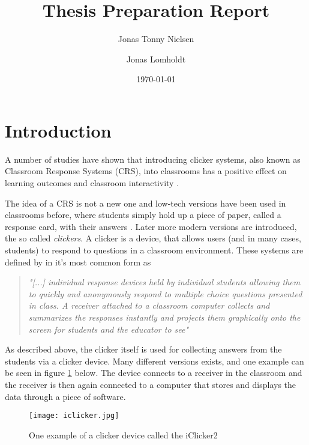 \documentclass{article}
\title{Thesis Preparation Report}
\author{Jonas Tonny Nielsen \and Jonas Lomholdt}
\date{\today}
\begin{document}
\maketitle

\listoftodos

\tableofcontents
\listoffigures


\section{Introduction} %
A number of studies have shown that introducing clicker systems, also known as Classroom Response Systems (CRS),  into classrooms has a positive effect on learning outcomes and classroom interactivity \cite{yourstone2008classroom, siau2006use, lantz2014effectiveness}. 

The idea of a CRS is not a new one and low-tech versions have been used in classrooms before, where students simply hold up a piece of paper, called a response card, with their answers \cite{ralph1994effects}. 
Later more modern versions are introduced, the so called \emph{clickers}. A clicker is a device, that allows users (and in many cases, students) to respond to questions in a classroom environment. These systems are defined by  in it's most common form as 

\begin{quote}
    \emph{"[...] individual response devices held by individual students allowing them to quickly and anonymously respond to multiple choice questions presented in class. A receiver attached to a classroom computer collects and summarizes the responses instantly and projects them graphically onto the screen for students and the educator to see"} \cite{lantz2014effectiveness}
\end{quote}

As described above, the clicker itself is used for collecting answers from the students via a clicker device. Many different versions exists, and one example can be seen in figure \ref{fig:iclicker} below. The device connects to a receiver in the classroom and the receiver is then again connected to a computer that stores and displays the data through a piece of software. 

\begin{figure}[H]
\capstart
	\centering
		\texttt{[image: iclicker.jpg]}
	\caption[iClicker2]{One example of a clicker device called the iClicker2 \label{fig:iclicker}}
\end{figure}
\end{document}

